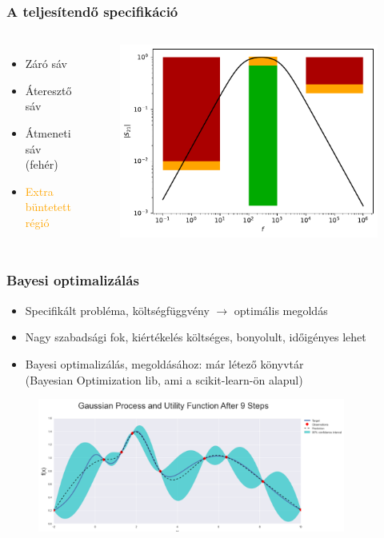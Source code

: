 \documentclass[aspectratio=43]{beamer}
\begin{document}
\begin{frame}
	\frametitle{A teljesítendő specifikáció}
	\begin{columns}
			\begin{itemize}
				\item \textcolor{stopred}{Záró sáv}
				\item \textcolor{passgreen}{Áteresztő sáv}
				\item Átmeneti sáv (fehér)
				\item \textcolor{orange}{Extra büntetett régió}
			\end{itemize}
			\begin{figure}
				\includegraphics[width=\textwidth]{atvitel_pelda.pdf}
			\end{figure}
	\end{columns}
\end{frame}

\begin{frame}
	\frametitle{Bayesi optimalizálás}
	\begin{itemize}
		\item Specifikált probléma, költségfüggvény $\rightarrow$ optimális megoldás
		\item Nagy szabadsági fok, kiértékelés költséges, bonyolult, időigényes lehet
		\item Bayesi optimalizálás, megoldásához: már létező könyvtár\\
		(Bayesian Optimization lib, ami a scikit-learn-ön alapul)
	\end{itemize}
	\begin{figure}
		\includegraphics[width=0.9\textwidth]{gauss.PNG}
	\end{figure}
\end{frame}
\end{document}
